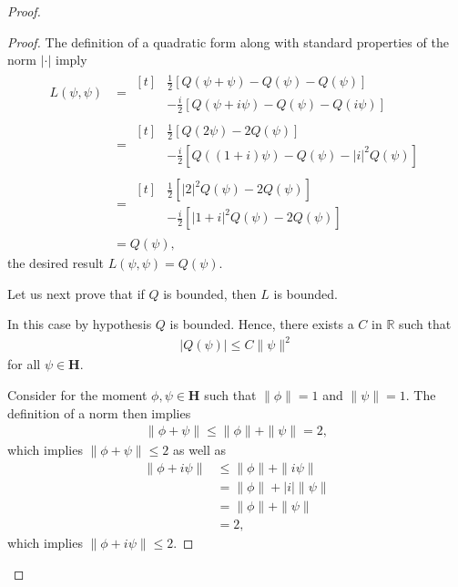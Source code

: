 \begin{proof}
\begin{proof}
The definition of a quadratic form along with standard properties of the norm $\lvert \cdot \rvert$ imply
\begin{align}
    L(\psi, \psi) &=
    \begin{aligned}[t]
        &\frac{1}{2} \left[ Q(\psi + \psi) - Q(\psi) - Q(\psi) \right] \\
        &-\frac{i}{2} \left[ Q(\psi + i\psi) - Q(\psi) - Q(i\psi) \right]
    \end{aligned} \\
    &=
    \begin{aligned}[t]
        &\frac{1}{2} \left[ Q(2\psi) - 2Q(\psi) \right] \\
        &-\frac{i}{2} \left[ Q((1 + i)\psi) - Q(\psi) - \lvert i \rvert^2 Q(\psi) \right]
    \end{aligned} \\
    &=
    \begin{aligned}[t]
        &\frac{1}{2} \left[ \lvert 2 \rvert^2Q(\psi) - 2Q(\psi) \right] \\
        &-\frac{i}{2} \left[ \lvert 1 + i \rvert^2Q(\psi) - 2Q(\psi) \right]
    \end{aligned} \\
    &= Q(\psi),
\end{align}
the desired result $L(\psi, \psi) = Q(\psi)$.

Let us next prove that if $Q$ is bounded, then $L$ is bounded.

In this case by hypothesis $Q$ is bounded. Hence, there exists a $C$ in $\mathbb{R}$ such that
\begin{align}
    \left\lvert Q(\psi) \right\rvert \le C \|\psi\|^2
\end{align}
for all $\psi \in \mathbf{H}$.

Consider for the moment $\phi, \psi \in \mathbf{H}$ such that $\|\phi\| = 1$ and $\|\psi\| = 1$. The definition of a norm then implies
\begin{align}
    \|\phi + \psi\| \le \|\phi\| + \|\psi\| = 2,
\end{align}
which implies $\|\phi + \psi\| \le 2$ as well as
\begin{align}
    \|\phi + i\psi\| &\le \|\phi\| + \|i\psi\| \\
                     &=    \|\phi\| + \lvert i \rvert \|\psi\| \\
                     &=    \|\phi\| + \|\psi\| \\
                     &=    2,
\end{align}
which implies $\|\phi + i\psi\| \le 2$.


\end{proof}
\end{proof}
